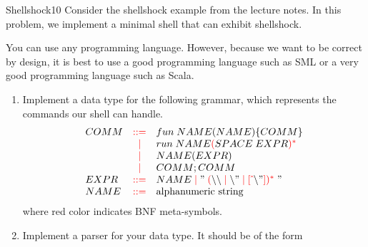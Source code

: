 \documentclass[a4paper]{article}
\begin{document}
\header

\begin{problem}{Shellshock}{10}
Consider the shellshock example from the lecture notes.
In this problem, we implement a minimal shell that can exhibit shellshock.

You can use any programming language.
However, because we want to be correct by design, it is best to use a good programming language such as SML or a very good programming language such as Scala.

\renewcommand{\bnf}[1]{{\color{red}#1}}
\begin{enumerate}
\item Implement a data type for the following grammar, which represents the commands our shell can handle.
\[\begin{array}{lcl}
 COMM & \bbc & fun\;NAME(NAME) \{COMM\} \\
      & \bnfalt & run\;NAME \rep{\bnfbracket{SPACE\; EXPR}} \\
      & \bnfalt & NAME(EXPR) \\
      & \bnfalt & COMM ; COMM \\
 EXPR & \bbc & NAME \bnfalt "\; \rep{\bnfbracket{\backslash\backslash \bnfalt \backslash" \bnfalt \bnfnegchoice{\backslash"}}} \;" \\
 NAME & \bbc & \text{alphanumeric string}
\end{array}\]
where red color indicates BNF meta-symbols.

\item Implement a parser for your data type. It should be of the form
\begin{acode}
\\
\end{acode}


\end{enumerate}
\end{problem}
\end{document}

